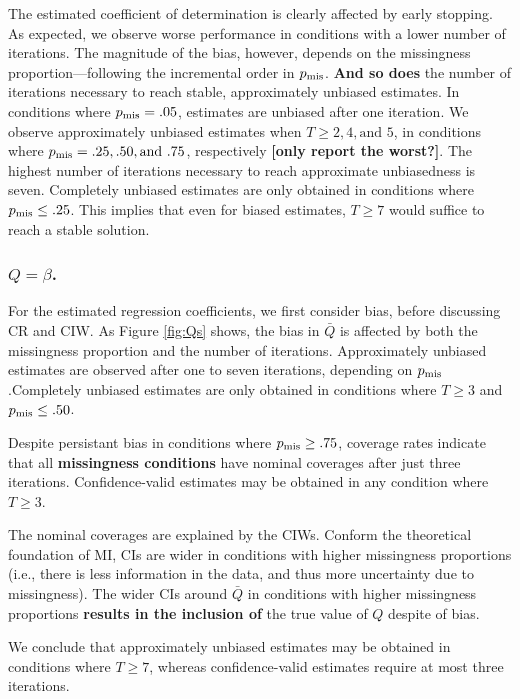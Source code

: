 \documentclass[Royal,times,sageh]{sagej}
\begin{document}
The estimated coefficient of determination is clearly affected by early stopping. As expected, we observe worse performance in conditions with a lower number of iterations. The magnitude of the bias, however, depends on the missingness proportion---following the incremental order in \(p_{\rm mis}\). \textbf{And so does} the number of iterations necessary to reach stable, approximately unbiased estimates. In conditions where \(p_{\rm mis}=.05\), estimates are unbiased after one iteration. We observe approximately unbiased estimates when \(T\geq 2,4, \text{and }5\), in conditions where \(p_{\rm mis} = .25, .50, \text{and }.75\), respectively \textbf{{[}only report the worst?{]}}. The highest number of iterations necessary to reach approximate unbiasedness is seven. Completely unbiased estimates are only obtained in conditions where \(p_{\rm mis}\leq.25\). This implies that even for biased estimates, \(T\geq7\) would suffice to reach a stable solution.

\hypertarget{qbeta.}{%
\subsubsection{\texorpdfstring{\(Q=\beta\).}{Q=\textbackslash beta.}}\label{qbeta.}}

For the estimated regression coefficients, we first consider bias, before discussing CR and CIW. As Figure \ref{fig:Qs} shows, the bias in \(\bar{Q}\) is affected by both the missingness proportion and the number of iterations. Approximately unbiased estimates are observed after one to seven iterations, depending on \(p_{\rm mis}\).Completely unbiased estimates are only obtained in conditions where \(T\geq3\) and \(p_{\rm mis}\leq .50\).

Despite persistant bias in conditions where \(p_{\rm mis}\geq.75\), coverage rates indicate that all \textbf{missingness conditions} have nominal coverages after just three iterations. Confidence-valid estimates may be obtained in any condition where \(T\geq3\).

The nominal coverages are explained by the CIWs. Conform the theoretical foundation of MI, CIs are wider in conditions with higher missingness proportions (i.e., there is less information in the data, and thus more uncertainty due to missingness). The wider CIs around \(\bar{Q}\) in conditions with higher missingness proportions \textbf{results in the inclusion of} the true value of \(Q\) despite of bias.

We conclude that approximately unbiased estimates may be obtained in conditions where \(T\geq7\), whereas confidence-valid estimates require at most three iterations.
\end{document}
